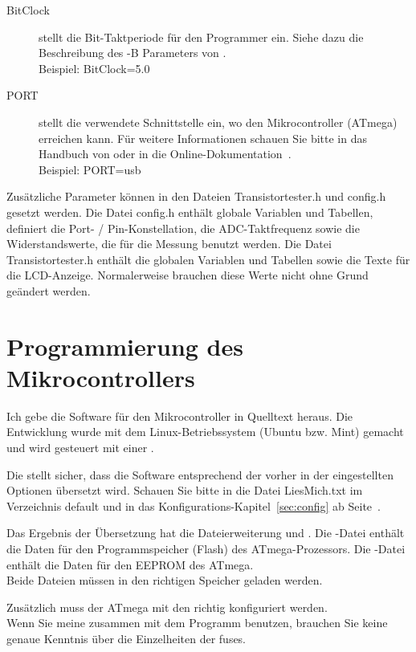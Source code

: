 \begin{description}
  \item[BitClock] stellt die Bit-Taktperiode für den Programmer ein. Siehe dazu die Beschreibung des -B Parameters von .\\
Beispiel: BitClock=5.0

  \item[PORT] stellt die verwendete Schnittstelle ein, wo  den Mikrocontroller (ATmega) erreichen kann.
  Für weitere Informationen schauen Sie bitte in das Handbuch von  oder in die Online-Dokumentation~\cite{avrdude}.\\
Beispiel: PORT=usb

\end{description}

Zusätzliche Parameter können in den Dateien Transistortester.h und config.h gesetzt werden.
Die Datei config.h enthält globale Variablen und Tabellen, definiert die Port- / Pin-Konstellation,
die ADC-Taktfrequenz sowie die Widerstandswerte, die für die Messung benutzt werden.
Die Datei Transistortester.h enthält die globalen Variablen und Tabellen sowie die Texte für die LCD-Anzeige.
Normalerweise brauchen diese Werte nicht ohne Grund geändert werden.


\section{Programmierung des Mikrocontrollers}
Ich gebe die Software für den Mikrocontroller in Quelltext heraus.
Die Entwicklung wurde mit dem Linux-Betriebssystem (Ubuntu bzw. Mint) gemacht
und wird gesteuert mit einer .

Die  stellt sicher, dass die Software entsprechend der vorher in der  
eingestellten Optionen übersetzt wird. Schauen Sie bitte in die Datei LiesMich.txt
im Verzeichnis default und in das Konfigurations-Kapitel~\ref{sec:config} ab Seite~\pageref{sec:config}.

Das Ergebnis der Übersetzung hat die Dateierweiterung  und .
Die -Datei enthält die Daten für den Programmspeicher (Flash) des ATmega-Prozessors.
Die -Datei enthält die Daten für den EEPROM des ATmega.\\
Beide Dateien müssen in den richtigen Speicher geladen werden.

Zusätzlich muss der ATmega mit den  richtig konfiguriert werden.\\
Wenn Sie meine  zusammen mit dem Programm  \cite{avrdude} benutzen,
brauchen Sie keine genaue Kenntnis über die Einzelheiten der fuses.

